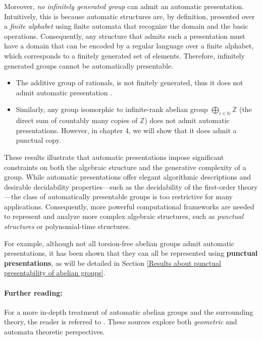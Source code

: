 \documentclass{pracalicmgr2025}
\theoremstyle{plain}            %
\theoremstyle{remark}           %
\theoremstyle{definition}       %
\begin{document}
Moreover, \emph{no infinitely generated group} can admit an automatic presentation. Intuitively, this is because automatic structures are, by definition, presented over a \emph{finite alphabet} using finite automata that recognize the domain and the basic operations. Consequently, any structure that admits such a presentation must have a domain that can be encoded by a regular language over a finite alphabet, which corresponds to a finitely generated set of elements. Therefore, infinitely generated groups cannot be automatically presentable.
\begin{itemize}
    \item The additive group of rationals, is not finitely generated, thus it does not admit automatic presentation \cite{TSANKOV2011}.
    \item Similarly, any group isomorphic to infinite-rank abelian group $\bigoplus_{i \in \mathbb{N}} \mathbb{Z}$ (the direct sum of countably many copies of $\mathbb{Z}$) does not admit automatic presentations. However, in chapter 4, we will show that it does admit a punctual copy.  
\end{itemize}
    


These results illustrate that automatic presentations impose significant constraints on both the algebraic structure and the generative complexity of a group. While automatic presentations offer elegant algorithmic descriptions and desirable decidability properties—such as the decidability of the first-order theory—the class of automatically presentable groups is too restrictive for many applications. Consequently, more powerful computational frameworks are needed to represent and analyze more complex algebraic structures, such as \emph{punctual structures} or polynomial-time structures.

For example, although not all torsion-free abelian groups admit automatic presentations, it has been shown that they can all be represented using \textbf{punctual presentations}, as will be detailed in Section \ref{Results about punctual presentability of abelian groups}.


\paragraph{Further reading:} For a more in-depth treatment of automatic abelian groups and the surrounding theory, the reader is referred to \cite{Epstein1992, NIES2008569, BraunGabor2011, NiesAndre2007}. These sources explore both \textit{geometric} and automata theoretic perspectives.
\end{document}
